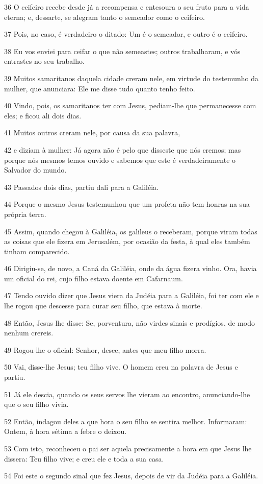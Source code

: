 \par 36 O ceifeiro recebe desde já a recompensa e entesoura o seu fruto para a vida eterna; e, dessarte, se alegram tanto o semeador como o ceifeiro.
\par 37 Pois, no caso, é verdadeiro o ditado: Um é o semeador, e outro é o ceifeiro.
\par 38 Eu vos enviei para ceifar o que não semeastes; outros trabalharam, e vós entrastes no seu trabalho.
\par 39 Muitos samaritanos daquela cidade creram nele, em virtude do testemunho da mulher, que anunciara: Ele me disse tudo quanto tenho feito.
\par 40 Vindo, pois, os samaritanos ter com Jesus, pediam-lhe que permanecesse com eles; e ficou ali dois dias.
\par 41 Muitos outros creram nele, por causa da sua palavra,
\par 42 e diziam à mulher: Já agora não é pelo que disseste que nós cremos; mas porque nós mesmos temos ouvido e sabemos que este é verdadeiramente o Salvador do mundo.
\par 43 Passados dois dias, partiu dali para a Galiléia.
\par 44 Porque o mesmo Jesus testemunhou que um profeta não tem honras na sua própria terra.
\par 45 Assim, quando chegou à Galiléia, os galileus o receberam, porque viram todas as coisas que ele fizera em Jerusalém, por ocasião da festa, à qual eles também tinham comparecido.
\par 46 Dirigiu-se, de novo, a Caná da Galiléia, onde da água fizera vinho. Ora, havia um oficial do rei, cujo filho estava doente em Cafarnaum.
\par 47 Tendo ouvido dizer que Jesus viera da Judéia para a Galiléia, foi ter com ele e lhe rogou que descesse para curar seu filho, que estava à morte.
\par 48 Então, Jesus lhe disse: Se, porventura, não virdes sinais e prodígios, de modo nenhum crereis.
\par 49 Rogou-lhe o oficial: Senhor, desce, antes que meu filho morra.
\par 50 Vai, disse-lhe Jesus; teu filho vive. O homem creu na palavra de Jesus e partiu.
\par 51 Já ele descia, quando os seus servos lhe vieram ao encontro, anunciando-lhe que o seu filho vivia.
\par 52 Então, indagou deles a que hora o seu filho se sentira melhor. Informaram: Ontem, à hora sétima a febre o deixou.
\par 53 Com isto, reconheceu o pai ser aquela precisamente a hora em que Jesus lhe dissera: Teu filho vive; e creu ele e toda a sua casa.
\par 54 Foi este o segundo sinal que fez Jesus, depois de vir da Judéia para a Galiléia.

